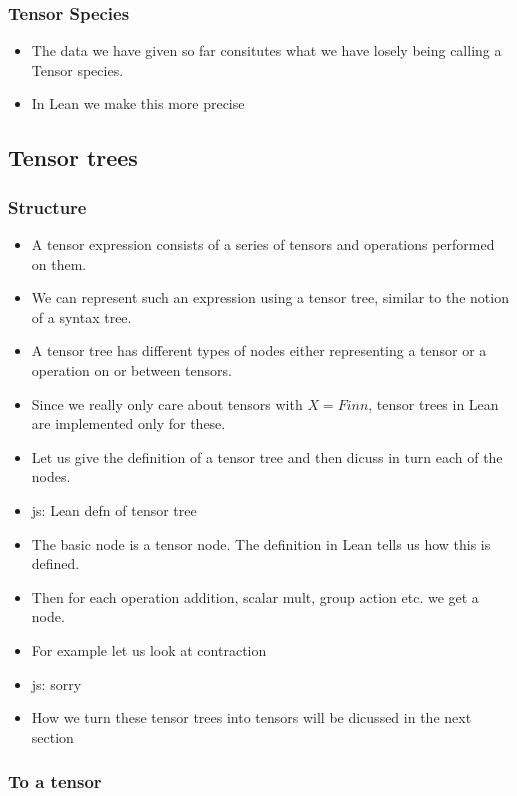 \documentclass[a4paper, 11pt]{article}
\newcommand{\js}[1]{ {\color{magenta} js:  #1}}
\begin{document}
\subsubsection{Tensor Species}

\begin{itemize}
  \item The data we have given so far consitutes what we have losely being calling a Tensor species. 
  \item In Lean we make this more precise 
\end{itemize}

\subsection{Tensor trees}
\subsubsection{Structure}
\begin{itemize}
  \item A tensor expression consists of a series of tensors and operations performed on them. 
  \item We can represent such an expression using a tensor tree, similar to the notion of a 
    syntax tree.
  \item A tensor tree has different types of nodes either representing a tensor or a operation 
    on or between tensors. 
  \item Since we really only care about tensors with $X = Fin n$, tensor trees in Lean are 
    implemented only for these. 
  \item Let us give the definition of a tensor tree and then dicuss in turn each of the nodes. 
  \item \js{Lean defn of tensor tree}
  \item The basic node is a tensor node. The definition in Lean tells us how this is defined. 
  \item Then for each operation addition, scalar mult, group action etc. we get a node. 
  \item For example let us look at contraction 
  \item \js{sorry}
  \item How we turn these tensor trees into tensors will be dicussed in the next section
\end{itemize}

\subsubsection{To a tensor}
\end{document}
